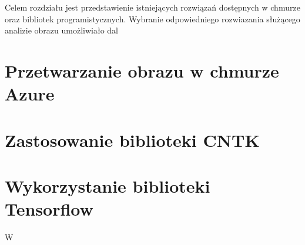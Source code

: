 Celem rozdziału jest przedstawienie istniejących rozwiązań dostępnych w chmurze oraz bibliotek programistycznych. Wybranie odpowiedniego rozwiazania służącego analizie obrazu umożliwiało dal



\section{Przetwarzanie obrazu w chmurze Azure} 

\section{Zastosowanie biblioteki CNTK}

\section{Wykorzystanie biblioteki Tensorflow}W